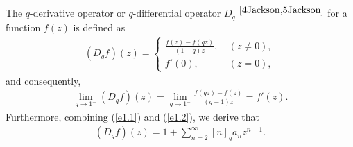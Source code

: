 \documentclass[11pt,twoside, reqno]{article}
\theoremstyle{definition}
\begin{document}
The $q$-derivative operator or $q$-differential operator $D_{q} $ $^{\cite{4Jackson,5Jackson}}$ for a function $f(z)$ is defined as
\begin{align}\label{e1.2}
(D_{q} f)(z)=\left\{\begin{matrix}\frac{f(z)-f(qz)}{(1-q)z},\  &(z\ne 0),
 \\{f}'(0),\ &(z=0) ,
\end{matrix}\right.
\end{align}
and consequently,
\begin{align}
\lim_{q \to 1^{-} } (D_{q}f )(z)=\lim_{q \to 1^{-} } \frac{f(qz)-f(z)}{(q-1)z} ={f}' (z). \nonumber
\end{align}
Furthermore, combining (\ref{e1.1}) and (\ref{e1.2}), we derive that
\begin{align}
 (D_{q}f )(z)=1+\sum_{n=2}^{\infty } \left [ n \right ] _{q} a_{n} z^{n-1} .\nonumber
\end{align}
\end{document}
